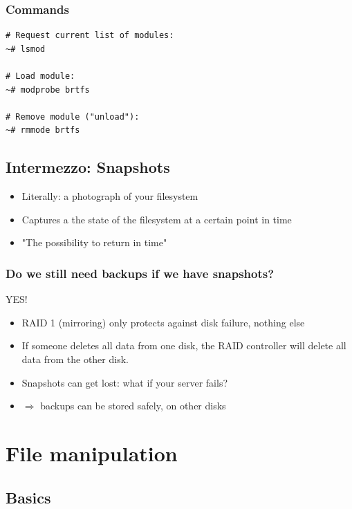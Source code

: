 \documentclass{article}
\begin{document}
\subsubsection{Commands}

\begin{verbatim}
# Request current list of modules:
~# lsmod

# Load module:
~# modprobe brtfs

# Remove module ("unload"):
~# rmmode brtfs

\end{verbatim}

\subsection{Intermezzo: Snapshots}

\begin{itemize}
    \item Literally: a photograph of your filesystem
    \item Captures a the state of the filesystem at a certain point in time
    \item "The possibility to return in time"
\end{itemize}

\subsubsection{Do we still need backups if we have snapshots?}

YES!

\begin{itemize}
    \item RAID 1 (mirroring) only protects against disk failure, nothing else
    \item If someone deletes all data from one disk, the RAID controller will delete all data from the other disk.
    \item Snapshots can get lost: what if your server fails?
    \item $\Rightarrow$ backups can be stored safely, on other disks
\end{itemize}

\section{File manipulation}

\subsection{Basics}
\end{document}
